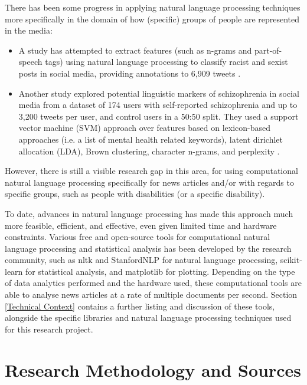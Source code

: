 \documentclass{report}
\begin{document}
There has been some progress in applying natural language processing techniques more specifically in the domain of how (specific) groups of people are represented in the media:
\begin{itemize}
	\item A study has attempted to extract features (such as n-grams and part-of-speech tags) using natural language processing to classify racist and sexist posts in social media, providing annotations to 6,909 tweets \cite{waseem2016you}.
	\item Another study explored potential linguistic markers of schizophrenia in social media from a dataset of 174 users with self-reported schizophrenia and up to 3,200 tweets per user, and control users in a 50:50 split.
		They used a support vector machine (SVM) approach over features based on lexicon-based approaches (i.e. a list of mental health related keywords), latent dirichlet allocation (LDA), Brown clustering, character n-grams, and perplexity \cite{mitchell2015quantifying}.
\end{itemize}
However, there is still a visible research gap in this area, for using computational natural language processing specifically for news articles and/or with regards to specific groups, such as people with disabilities (or a specific disability).

To date, advances in natural language processing has made this approach much more feasible, efficient, and effective, even given limited time and hardware constraints.
Various free and open-source tools for computational natural language processing and statistical analysis has been developed by the research community, such as nltk \cite{Nltk} and StanfordNLP \cite{StanfordNLP} for natural language processing, scikit-learn \cite{Scikit-learn} for statistical analysis, and matplotlib \cite{Matplotlib} for plotting.
Depending on the type of data analytics performed and the hardware used, these computational tools are able to analyse news articles at a rate of multiple documents per second.
Section \ref{Technical Context} contains a further listing and discussion of these tools, alongside the specific libraries and natural language processing techniques used for this research project.

\section{Research Methodology and Sources} \label{Research Methodology and Sources}  %
\end{document}
